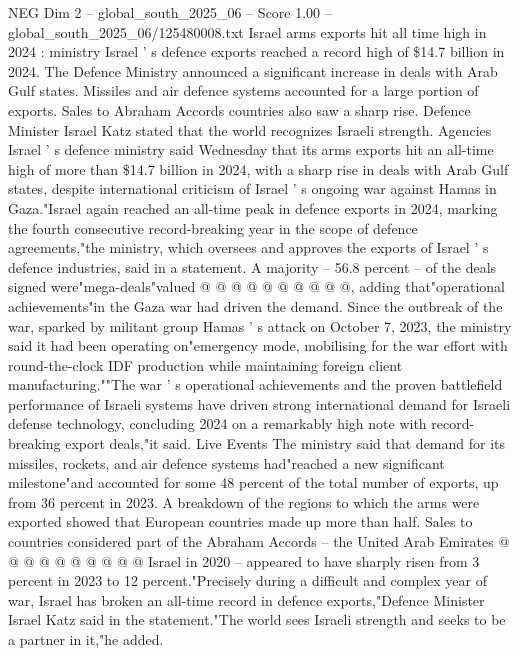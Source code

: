 \begin{textsample}{NEG Dim 2 – global\_south\_2025\_06 – Score 1.00 – global\_south\_2025\_06/125480008.txt}  \label{ex:f2_neg_361}
Israel arms exports hit all time high in 2024 : ministry Israel ' s defence exports reached a record high of \$14.7 billion in 2024.
The Defence Ministry announced a significant increase in deals with Arab Gulf states.
Missiles and air defence systems accounted for a large portion of exports.
Sales to Abraham Accords countries also saw a sharp rise.
Defence Minister Israel Katz stated that the world recognizes Israeli strength.
Agencies Israel ' s defence ministry said Wednesday that its arms exports hit an all-time high of more than \$14.7 billion in 2024, with a sharp rise in deals with Arab Gulf states, despite international criticism of Israel ' s ongoing war against Hamas in Gaza."Israel again reached an all-time peak in defence exports in 2024, marking the fourth consecutive record-breaking year in the scope of defence agreements,"the ministry, which oversees and approves the exports of Israel ' s defence industries, said in a statement.
A majority -- 56.8 percent -- of the deals signed were"mega-deals"valued @ @ @ @ @ @ @ @ @ @, adding that"operational achievements"in the Gaza war had driven the demand.
Since the outbreak of the war, sparked by militant group Hamas ' s attack on October 7, 2023, the ministry said it had been operating on"emergency mode, mobilising for the war effort with round-the-clock IDF production while maintaining foreign client manufacturing.""The war ' s operational achievements and the proven battlefield performance of Israeli systems have driven strong international demand for Israeli defense technology, concluding 2024 on a remarkably high note with record-breaking export deals,"it said.
Live Events The ministry said that demand for its missiles, rockets, and air defence systems had"reached a new significant milestone"and accounted for some 48 percent of the total number of exports, up from 36 percent in 2023.
A breakdown of the regions to which the arms were exported showed that European countries made up more than half.
Sales to countries considered part of the Abraham Accords -- the United Arab Emirates @ @ @ @ @ @ @ @ @ @ Israel in 2020 -- appeared to have sharply risen from 3 percent in 2023 to 12 percent."Precisely during a difficult and complex year of war, Israel has broken an all-time record in defence exports,"Defence Minister Israel Katz said in the statement."The world sees Israeli strength and seeks to be a partner in it,"he added.

\end{textsample}
